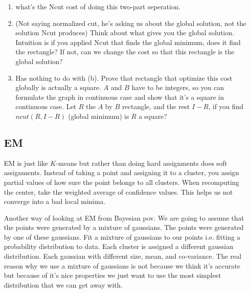 \begin{enumerate}
  \begin{enumerate}
  \item what's  the Ncut cost of doing this two-part seperation.
  \item (Not saying normalized cut, he's asking us about the global
    solution, not the solution Ncut produces) Think about what gives
    you the global solution. Intuition is if you applied Ncut that
    finds the global minimum, does it find the rectangle? If not, can
    we change the cost so that this rectangle is the global solution?
  \item Has nothing to do with (b). Prove that rectangle that optimize this cost globally is actually a
    square. $A$ and $B$ have to be integers, so you can formulate the
    graph in continuous case and show that it's a square in continuous
    case. Let $R$ the $A$ by $B$ rectangle, and the rest $I-R$, if you
    find $ncut(R, I-R)$ (global minimum) is $R$ a square?
  \end{enumerate}
\end{enumerate}

\subsection{EM}
\label{sec:EM}
EM is just like $K$-means but rather than doing hard assignments does
soft assignments. Instead of taking a point and assigning it to a
cluster, you assign partial values of how sure the point belongs to
all clusters. When recomputing the center, take the weighted average
of confidence values. This helps us not converge into a bad local
minima.

Another way of looking at EM from Bayesian pov. We are going to assume
that the points were generated by a mixture of gaussians. The points
were generated by one of these gaussians. Fit a mixture of gaussians
to our points i.e. fitting a probability distribution to data. Each
cluster is assigned a different gaussian distribution. Each gaussian
with different size, mean, and co-variance. The real reason
why we use a mixture of gaussians is not because we think it's
accurate but because of it's nice properties we just want to use the
most simplest distribution that we can get away with. 


